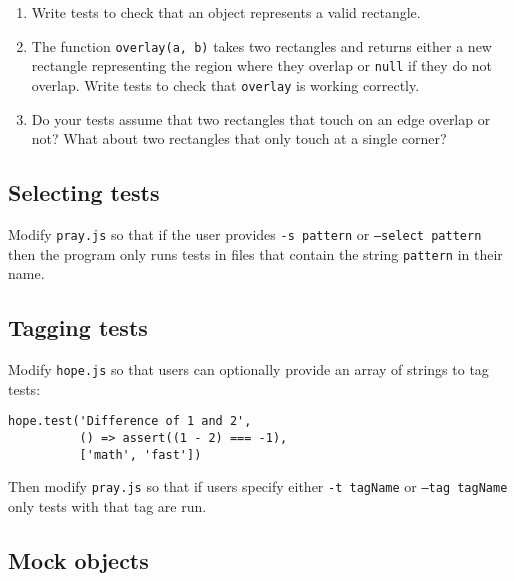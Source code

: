 \documentclass[krantzl]{krantz}
\begin{document}
\begin{enumerate}

\item 

Write tests to check that an object represents a valid rectangle.



\item 

The function \texttt{overlay(a, b)} takes two rectangles and returns either
    a new rectangle representing the region where they overlap or \texttt{null} if they do not overlap.
    Write tests to check that \texttt{overlay} is working correctly.



\item 

Do your tests assume that two rectangles that touch on an edge overlap or not?
    What about two rectangles that only touch at a single corner?



\end{enumerate}

\subsection*{Selecting tests}


Modify \texttt{pray.js} so that if the user provides \texttt{-s pattern} or \texttt{--select pattern}
then the program only runs tests in files that contain the string \texttt{pattern} in their name.

\subsection*{Tagging tests}


Modify \texttt{hope.js} so that users can optionally provide an array of strings to tag tests:

\begin{lstlisting}[frame=tblr]
hope.test('Difference of 1 and 2',
          () => assert((1 - 2) === -1),
          ['math', 'fast'])
\end{lstlisting}


Then modify \texttt{pray.js} so that if users specify either \texttt{-t tagName} or \texttt{--tag tagName}
only tests with that tag are run.

\subsection*{Mock objects}
\end{document}
